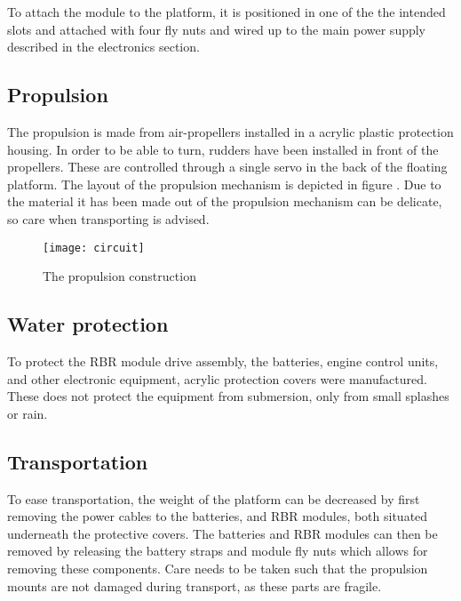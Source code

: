 To attach the module to the platform, it is positioned in one of the the intended slots and attached with four fly nuts and wired up to the main power supply described in the electronics section.

\subsection{Propulsion}
The propulsion is made from air-propellers installed in a acrylic plastic protection housing. In order to be able to turn, rudders have been installed in front of the propellers. These are controlled through a single servo in the back of the floating platform. The layout of the propulsion mechanism is depicted in figure . Due to the material it has been made out of the propulsion mechanism can be delicate, so care when transporting is advised. 
\begin{figure}[h]
   \centering
   \texttt{[image: circuit]}
   \caption{The propulsion construction}
   \label{fig:circuit}
\end{figure}

\subsection{Water protection}
To protect the RBR module drive assembly, the batteries, engine control units, and other electronic equipment, acrylic protection covers were manufactured. These does not protect the equipment from submersion, only from small splashes or rain. 
\subsection{Transportation}
To ease transportation, the weight of the platform can be decreased by first removing the power cables to the batteries, and RBR modules, both situated underneath the protective covers. The batteries and RBR modules can then be removed by releasing the battery straps and module fly nuts which allows for removing these components. Care needs to be taken such that the propulsion mounts are not damaged during transport, as these parts are fragile.


